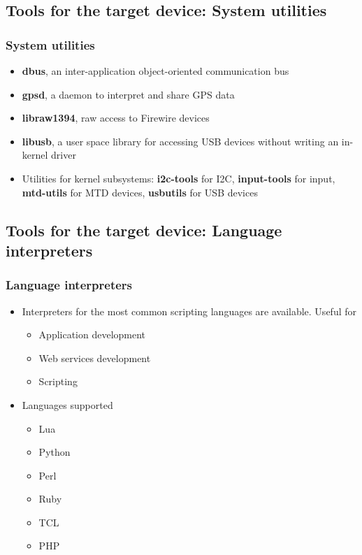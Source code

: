 \subsection[System utilities]{Tools for the target device: System
  utilities}

\begin{frame}
  \frametitle{System utilities}
  \begin{itemize}
  \item {\bf dbus}, an inter-application object-oriented communication bus
  \item {\bf gpsd}, a daemon to interpret and share GPS data
  \item {\bf libraw1394}, raw access to Firewire devices
  \item {\bf libusb}, a user space library for accessing USB devices
    without writing an in-kernel driver
  \item Utilities for kernel subsystems: {\bf i2c-tools} for I2C, {\bf
      input-tools} for input, {\bf mtd-utils} for MTD devices, {\bf
      usbutils} for USB devices
  \end{itemize}
\end{frame}

\subsection[Language Interpreters]{Tools for the target device:
  Language interpreters}

\begin{frame}
  \frametitle{Language interpreters}
  \begin{itemize}
  \item Interpreters for the most common scripting languages are
    available. Useful for
    \begin{itemize}
    \item Application development
    \item Web services development
    \item Scripting
    \end{itemize}
  \item Languages supported
    \begin{itemize}
    \item Lua
    \item Python
    \item Perl
    \item Ruby
    \item TCL
    \item PHP
    \end{itemize}
  \end{itemize}
\end{frame}

